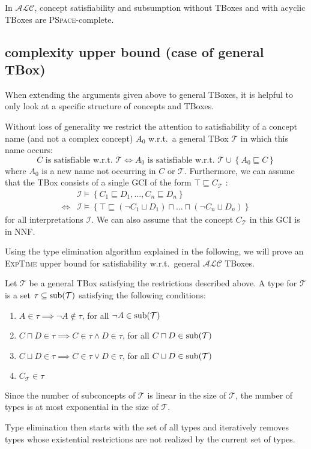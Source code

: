 \begin{theorem}
	In $\mathcal{ALC}$, concept satisfiability and subsumption
	without TBoxes and with acyclic TBoxes are \textsc{PSpace}-complete.
\end{theorem}

\subsection{complexity upper bound (case of general TBox)}
When extending the arguments given above to general TBoxes,
it is helpful to only look at a specific structure of concepts and TBoxes.

Without loss of generality we restrict the attention to satisfiability of a concept name
(and not a complex concept) $A_0$ w.r.t.\ a general TBox $\mathcal{T}$ in which this name occurs:
\[
C \text{ is satisfiable w.r.t.\ } \mathcal{T} \iff A_0 \text{ is satisfiable w.r.t.\ }\mathcal{T} \cup \left\{ A_0 \sqsubseteq C \right\}
\]
where $A_0$ is a new name not occurring in $C$ or $\mathcal{T}$.
Furthermore, we can assume that the TBox consists of a single GCI of the form $\top \sqsubseteq C_{\mathcal{T}}$ :
\[
	\begin{split}
		&\mathcal{I} \vDash \left\{ C_1 \sqsubseteq D_1, \ldots, C_n \sqsubseteq D_n \right\} \\ \iff &\mathcal{I} \vDash \left\{ \top \sqsubseteq (\neg C_1 \sqcup D_1) \sqcap \ldots \sqcap (\neg C_n \sqcup D_n) \right\}
	\end{split}
\]
for all interpretations $\mathcal{I}$.
We can also assume that the concept $C_{\mathcal{T}}$ in this GCI is in NNF.

Using the type elimination algorithm explained in the following,
we will prove an \textsc{ExpTime} upper bound for satisfiability w.r.t.\ general $\mathcal{ALC}$ TBoxes.

\begin{definition}[type]
	Let $\mathcal{T}$ be a general TBox satisfying the restrictions described above.
	A type for $\mathcal{T}$ is a set $\tau \subseteq \operatorname{\text{sub}}(\mathcal{T})$ satisfying the following conditions:
	\begin{enumerate}[label=(\roman*)]
		\item $A \in \tau \implies \neg A \notin \tau$, for all $\neg A \in \operatorname{\text{sub}}(\mathcal{T})$
		\item $C \sqcap D \in \tau \implies C \in \tau \land D \in \tau$, for all $C \sqcap D \in \func{sub}(\mathcal{T})$
		\item $C \sqcup D \in \tau \implies C \in \tau \lor D \in \tau$, for all $C \sqcup D \in \func{sub}(\mathcal{T})$
		\item $C_{\mathcal{T}} \in \tau$
	\end{enumerate}
\end{definition}
\begin{note}
	Since the number of subconcepts of $\mathcal{T}$ is linear in the size of $\mathcal{T}$,
	the number of types is at most exponential in the size of $\mathcal{T}$.
\end{note}

Type elimination then starts with the set of all types and iteratively removes types
whose existential restrictions are not realized by the current set of types.
